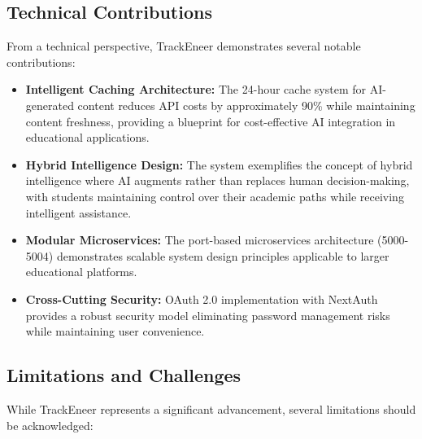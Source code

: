 \documentclass[12pt]{article}
\begin{document}
\subsection{Technical Contributions}
From a technical perspective, TrackEneer demonstrates several notable contributions:

\begin{itemize}
    \item \textbf{Intelligent Caching Architecture:} The 24-hour cache system for AI-generated content reduces API costs by approximately 90\% while maintaining content freshness, providing a blueprint for cost-effective AI integration in educational applications.
    
    \item \textbf{Hybrid Intelligence Design:} The system exemplifies the concept of hybrid intelligence where AI augments rather than replaces human decision-making, with students maintaining control over their academic paths while receiving intelligent assistance.
    
    \item \textbf{Modular Microservices:} The port-based microservices architecture (5000-5004) demonstrates scalable system design principles applicable to larger educational platforms.
    
    \item \textbf{Cross-Cutting Security:} OAuth 2.0 implementation with NextAuth provides a robust security model eliminating password management risks while maintaining user convenience.
\end{itemize}

\subsection{Limitations and Challenges}
While TrackEneer represents a significant advancement, several limitations should be acknowledged:
\end{document}
